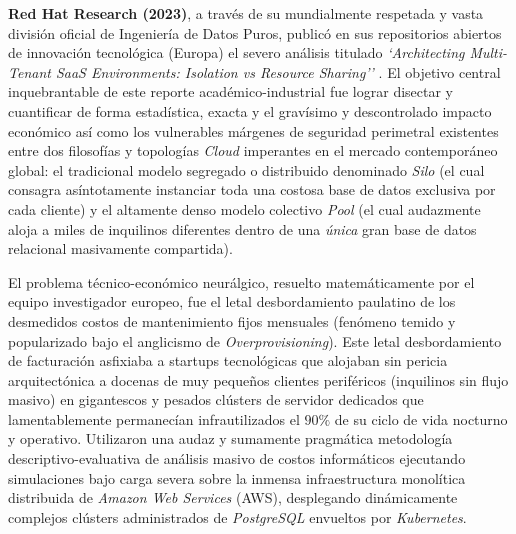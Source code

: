 \textbf{Red Hat Research (2023)}, a través de su mundialmente respetada y vasta división oficial de Ingeniería de Datos Puros, publicó en sus repositorios abiertos de innovación tecnológica (Europa) el severo análisis titulado \textit{`Architecting Multi-Tenant SaaS Environments: Isolation vs Resource Sharing''} \citep{redhat2023}. El objetivo central inquebrantable de este reporte académico-industrial fue lograr disectar y cuantificar de forma estadística, exacta y el gravísimo y descontrolado impacto económico así como los vulnerables márgenes de seguridad perimetral existentes entre dos filosofías y topologías \textit{Cloud} imperantes en el mercado contemporáneo global: el tradicional modelo segregado o distribuido denominado \textit{Silo} (el cual consagra asíntotamente instanciar toda una costosa base de datos exclusiva por cada cliente) y el altamente denso modelo colectivo \textit{Pool} (el cual audazmente aloja a miles de inquilinos diferentes dentro de una \textit{única} gran base de datos relacional masivamente compartida). 

El problema técnico-económico neurálgico, resuelto matemáticamente por el equipo investigador europeo, fue el letal desbordamiento paulatino de los desmedidos costos de mantenimiento fijos mensuales (fenómeno temido y popularizado bajo el anglicismo de \textit{Overprovisioning}). Este letal desbordamiento de facturación asfixiaba a startups tecnológicas que alojaban sin pericia arquitectónica a docenas de muy pequeños clientes periféricos (inquilinos sin flujo masivo) en gigantescos y pesados clústers de servidor dedicados que lamentablemente permanecían infrautilizados el $90\%$ de su ciclo de vida nocturno y operativo. Utilizaron una audaz y sumamente pragmática metodología descriptivo-evaluativa de análisis masivo de costos informáticos ejecutando simulaciones bajo carga severa sobre la inmensa infraestructura monolítica distribuida de \textit{Amazon Web Services} (AWS), desplegando dinámicamente complejos clústers administrados de \textit{PostgreSQL} envueltos por \textit{Kubernetes}. 


